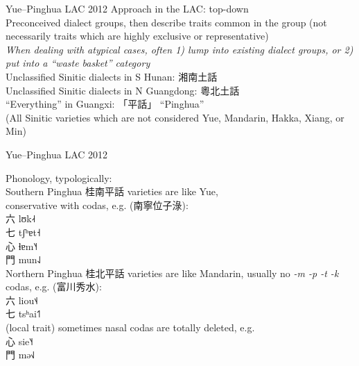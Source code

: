 \documentclass{beamer}
\begin{document}
\begin{frame}[fragile]{Yue–Pinghua \scriptsize{LAC 2012}}
Approach in the LAC: top-down\\
Preconceived dialect groups, then describe traits common in the group (not necessarily traits which are highly exclusive or representative)\\
\medskip
\textit{When dealing with atypical cases, often 1) lump into existing dialect groups, or 2) put into a \enquote{waste basket} category}\\
\medskip
Unclassified Sinitic dialects in S Hunan: 湘南土話\\
\smallskip
Unclassified Sinitic dialects in N Guangdong: 粵北土話\\
\smallskip
\enquote{Everything} in Guangxi: 「平話」 \enquote{Pinghua}\\ 
{\footnotesize (All Sinitic varieties which are not considered Yue, Mandarin, Hakka, Xiang, or Min)}\\

\end{frame}

\begin{frame}[fragile]{Yue–Pinghua \scriptsize{LAC 2012}}

Phonology, typologically:\\
\medskip
Southern Pinghua 桂南平話 varieties are like Yue,\\ conservative with codas, e.g. (南寧位子淥):\\
六 lʊk˨˧\\ 
七 tʃʰɐt˧\\ 
心 ɬɐm˥˧\\ 
門 mun˨˩\\
\medskip
Northern Pinghua 桂北平話 varieties are like Mandarin, usually no \textit{-m -p -t -k} codas, e.g. (富川秀水):\\ 
六 liou˦˨\\ 
七 tsʰai˦˥\\
(local trait) sometimes nasal codas are totally deleted, e.g.\\ 
心 sie˥˧\\ 
門 mə˧˩\\

\end{frame}
\end{document}
